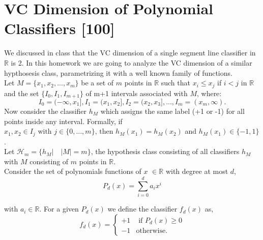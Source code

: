 \documentclass{article}
\begin{document}
\newpage


\section{VC Dimension of Polynomial Classifiers [100]}
\label{prb:hw4::prob1}
We discussed in class that the VC dimension of a single segment line classifier in $\mathbb{R}$ is 2. In this homework we are going to analyze the VC dimension of a similar hypthosesis class, parametrizing it with a well known family of functions.\\

Let $M=\{x_1, x_2, ..., x_m\}$ be a set of $m$ points in $\mathbb{R}$ such that $x_i \leq x_j$ if $i<j$ in $\mathbb{R}$ and the set $\{I_0, I_1, I_{m+1}\}$ of m+1 intervals associated with $M$, where: 
$$I_0=(-\infty, x_1], I_1=(x_1, x_2], I_2=(x_2, x_3], ..., I_{m}=(x_m, \infty).$$
Now consider the classifier $h_M$ which assigns the same label (+1 or -1) for all points inside any interval. Formally, if $x_1,x_2 \in I_j \text{ with } j \in \{0,...,m\} \text{, then } h_M(x_1)=h_M(x_2) $ and $h_M(x_1) \in \{-1,1\}$.\\

Let $\mathcal{H}_m=\{ h_M | \quad |M|=m \}$, the hypothesis class consisting of all classifiers $h_M$ with $M$ consisting of $m$ points in $\mathbb{R}$.\\


Consider the set of polynomials functions of $x$ $\in \mathbb{R}$ with degree at most $d$, 
$$P_d(x) = \sum_{i=0}^d a_i x^i$$

with $a_i \in \mathbb{R}$. For a given $P_d(x)$ we define the classifier $f_d(x)$ as,
\[
f_{d}(x) = 
\begin{cases}
+1 & \text{ if } P_d(x) \geq 0 \\
-1 & \text{otherwise}.
\end{cases}
\]
\end{document}
